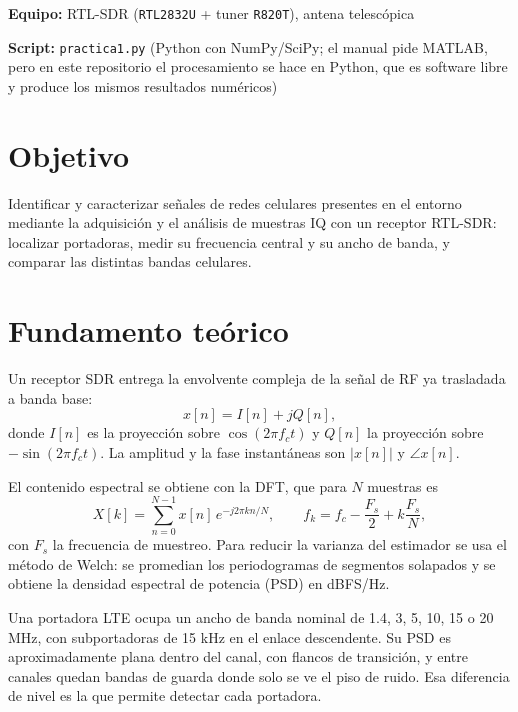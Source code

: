\documentclass[11pt,a4paper]{article}
\begin{document}

\textbf{Equipo:} RTL-SDR (\texttt{RTL2832U} + tuner \texttt{R820T}), antena telescópica

\textbf{Script:} \texttt{practica1.py} (Python con NumPy/SciPy; el manual pide MATLAB, pero
en este repositorio el procesamiento se hace en Python, que es software libre y produce
los mismos resultados numéricos)

\section{Objetivo}

Identificar y caracterizar señales de redes celulares presentes en el entorno mediante la
adquisición y el análisis de muestras IQ con un receptor RTL-SDR: localizar portadoras,
medir su frecuencia central y su ancho de banda, y comparar las distintas bandas celulares.

\section{Fundamento teórico}

Un receptor SDR entrega la envolvente compleja de la señal de RF ya trasladada a banda base:
\begin{equation}
  x[n] = I[n] + jQ[n],
\end{equation}
donde $I[n]$ es la proyección sobre $\cos(2\pi f_c t)$ y $Q[n]$ la proyección sobre
$-\sin(2\pi f_c t)$. La amplitud y la fase instantáneas son $|x[n]|$ y $\angle x[n]$.

El contenido espectral se obtiene con la DFT, que para $N$ muestras es
\begin{equation}
  X[k] = \sum_{n=0}^{N-1} x[n]\,e^{-j2\pi kn/N},
  \qquad
  f_k = f_c - \frac{F_s}{2} + k\frac{F_s}{N},
\end{equation}
con $F_s$ la frecuencia de muestreo. Para reducir la varianza del estimador se usa el
método de Welch: se promedian los periodogramas de segmentos solapados y se obtiene la
densidad espectral de potencia (PSD) en dBFS/Hz.

Una portadora LTE ocupa un ancho de banda nominal de 1.4, 3, 5, 10, 15 o 20 MHz, con
subportadoras de 15 kHz en el enlace descendente. Su PSD es aproximadamente plana dentro
del canal, con flancos de transición, y entre canales quedan bandas de guarda donde solo se
ve el piso de ruido. Esa diferencia de nivel es la que permite detectar cada portadora.
\end{document}

